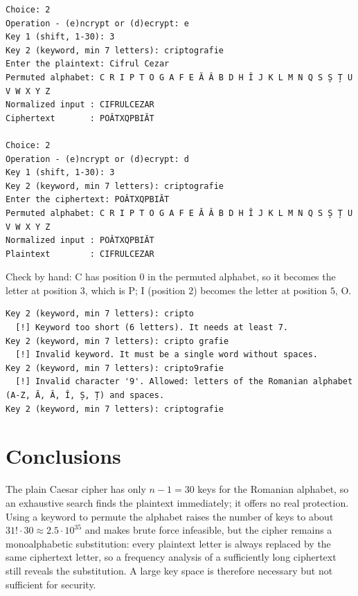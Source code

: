 \documentclass[12pt,a4paper]{article}
\begin{document}
\begin{lstlisting}[language={},numbers=none,basicstyle=\ttfamily\footnotesize,caption={Encryption and decryption with $k_1=3$, $k_2=\textit{criptografie}$.}]
Choice: 2
Operation - (e)ncrypt or (d)ecrypt: e
Key 1 (shift, 1-30): 3
Key 2 (keyword, min 7 letters): criptografie
Enter the plaintext: Cifrul Cezar
Permuted alphabet: C R I P T O G A F E Ă Â B D H Î J K L M N Q S Ș Ț U V W X Y Z
Normalized input : CIFRULCEZAR
Ciphertext       : POÂTXQPBIĂT

Choice: 2
Operation - (e)ncrypt or (d)ecrypt: d
Key 1 (shift, 1-30): 3
Key 2 (keyword, min 7 letters): criptografie
Enter the ciphertext: POÂTXQPBIĂT
Permuted alphabet: C R I P T O G A F E Ă Â B D H Î J K L M N Q S Ș Ț U V W X Y Z
Normalized input : POÂTXQPBIĂT
Plaintext        : CIFRULCEZAR
\end{lstlisting}
Check by hand: C has position $0$ in the permuted alphabet, so it becomes the letter
at position $3$, which is P; I (position $2$) becomes the letter at position $5$, O.

\begin{lstlisting}[language={},numbers=none,basicstyle=\ttfamily\footnotesize,caption={Task 1.2 -- invalid keywords.}]
Key 2 (keyword, min 7 letters): cripto
  [!] Keyword too short (6 letters). It needs at least 7.
Key 2 (keyword, min 7 letters): cripto grafie
  [!] Invalid keyword. It must be a single word without spaces.
Key 2 (keyword, min 7 letters): cripto9rafie
  [!] Invalid character '9'. Allowed: letters of the Romanian alphabet (A-Z, Ă, Â, Î, Ș, Ț) and spaces.
Key 2 (keyword, min 7 letters): criptografie
\end{lstlisting}

\section{Conclusions}

The plain Caesar cipher has only $n-1 = 30$ keys for the Romanian alphabet, so an
exhaustive search finds the plaintext immediately; it offers no real protection.
Using a keyword to permute the alphabet raises the number of keys to about
$31!\cdot 30 \approx 2.5\cdot10^{35}$ and makes brute force infeasible, but the
cipher remains a monoalphabetic substitution: every plaintext letter is always
replaced by the same ciphertext letter, so a frequency analysis of a sufficiently
long ciphertext still reveals the substitution. A large key space is therefore
necessary but not sufficient for security.
\end{document}
